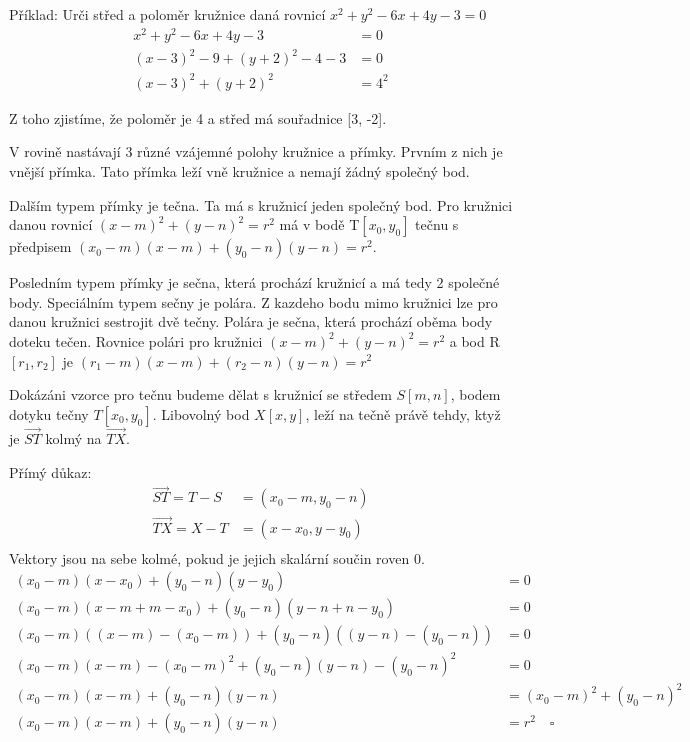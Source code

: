\documentclass[12pt]{article}
\begin{document}
Příklad: Urči střed a poloměr kružnice daná rovnicí $x^2 + y^2 - 6x + 4y - 3 = 0$
\[
\begin{align*}
    x^2 + y^2 - 6x + 4y - 3 &= 0 \\
    (x - 3)^2 - 9 + (y + 2)^2 - 4 - 3 &= 0 \\
    (x - 3)^2 + (y + 2)^2 &= 4^2
\end{align*}
\]

Z toho zjistíme, že poloměr je 4 a střed má souřadnice [3, -2].

V rovině nastávají 3 různé vzájemné polohy kružnice a přímky. Prvním z nich je vnější přímka.
Tato přímka leží vně kružnice a nemají žádný společný bod.

Dalším typem přímky je tečna. Ta má s
kružnicí jeden společný bod. Pro kružnici danou rovnicí $(x - m)^2 + (y - n)^2 = r^2$ má v bodě
T$[x_0, y_0]$ tečnu s předpisem $(x_0 - m)(x - m) + (y_0 - n)(y - n) = r^2$.

Posledním typem přímky je sečna, která prochází kružnicí a má tedy 2 společné body. Speciálním typem
sečny je polára. Z kazdeho bodu mimo kružnici lze pro danou kružnici sestrojit dvě tečny. Polára je
sečna, která prochází oběma body doteku tečen. Rovnice polári pro kružnici $(x - m)^2 + (y - n)^2 =
r^2$ a bod R$[r_1, r_2]$ je $(r_1 - m)(x - m) + (r_2 - n)(y - n) = r^2$

Dokázáni vzorce pro tečnu budeme dělat s kružnicí se středem $S[m, n]$, bodem dotyku tečny
$T[x_0, y_0]$. Libovolný bod $X[x, y]$, leží na tečně právě tehdy, ktyž je $\vec{ST}$ kolmý na
$\vec{TX}$.

Přímý důkaz:
\[
\begin{align*}
    \vec{ST} = T - S &= (x_0 - m, y_0 - n) \\
    \vec{TX} = X - T &= (x - x_0, y - y_0) \\
\end{align*}
\]
Vektory jsou na sebe kolmé, pokud je jejich skalární součin roven 0.
\[
\begin{align*}
    (x_0 - m)(x - x_0) + (y_0 - n)(y - y_0) &= 0 \\
    (x_0 - m)(x - m + m - x_0) + (y_0 - n)(y - n + n - y_0) &= 0 \\
    (x_0 - m)((x - m) - (x_0 - m)) + (y_0 - n)((y - n) - (y_0 - n)) &= 0 \\
    (x_0 - m)(x - m) - (x_0 - m)^2 + (y_0 - n)(y - n) - (y_0 - n)^2 &= 0 \\
    (x_0 - m)(x - m) + (y_0 - n)(y - n) &= (x_0 - m)^2 + (y_0 - n)^2 \\
    (x_0 - m)(x - m) + (y_0 - n)(y - n) &= r^2 \quad \square
\end{align*}
\]
\end{document}

